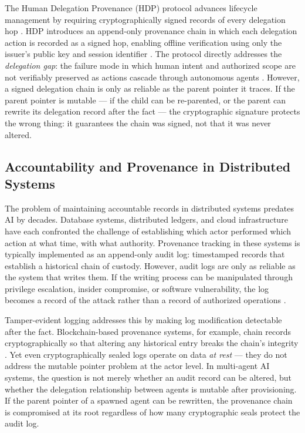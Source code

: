 The Human Delegation Provenance (HDP) protocol advances lifecycle management by requiring cryptographically signed records of every delegation hop \cite{hdp2026,helixar2026}. HDP introduces an append-only provenance chain in which each delegation action is recorded as a signed hop, enabling offline verification using only the issuer's public key and session identifier \cite{ietf-hdp}. The protocol directly addresses the \emph{delegation gap}: the failure mode in which human intent and authorized scope are not verifiably preserved as actions cascade through autonomous agents \cite{arxiv2604.04522}. However, a signed delegation chain is only as reliable as the parent pointer it traces. If the parent pointer is mutable — if the child can be re-parented, or the parent can rewrite its delegation record after the fact — the cryptographic signature protects the wrong thing: it guarantees the chain was signed, not that it was never altered.

\subsection{Accountability and Provenance in Distributed Systems}
\label{sec:accountability-provenance}

The problem of maintaining accountable records in distributed systems predates AI by decades. Database systems, distributed ledgers, and cloud infrastructure have each confronted the challenge of establishing which actor performed which action at what time, with what authority. Provenance tracking in these systems is typically implemented as an append-only audit log: timestamped records that establish a historical chain of custody. However, audit logs are only as reliable as the system that writes them. If the writing process can be manipulated through privilege escalation, insider compromise, or software vulnerability, the log becomes a record of the attack rather than a record of authorized operations \cite{zylos2026}.

Tamper-evident logging addresses this by making log modification detectable after the fact. Blockchain-based provenance systems, for example, chain records cryptographically so that altering any historical entry breaks the chain's integrity \cite{openexecution2026}. Yet even cryptographically sealed logs operate on data \emph{at rest} — they do not address the mutable pointer problem at the actor level. In multi-agent AI systems, the question is not merely whether an audit record can be altered, but whether the delegation relationship between agents is mutable after provisioning. If the parent pointer of a spawned agent can be rewritten, the provenance chain is compromised at its root regardless of how many cryptographic seals protect the audit log.

